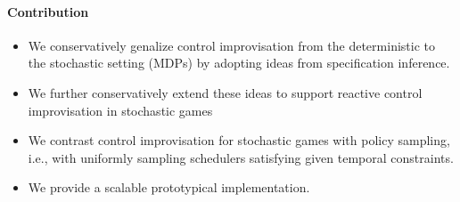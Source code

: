 \paragraph{Contribution}

\begin{itemize}
\item We conservatively genalize control improvisation from the deterministic to the stochastic setting (MDPs) by adopting ideas from specification inference.
\item We further conservatively extend these ideas to support reactive control improvisation in stochastic games
\item We contrast control improvisation for stochastic games with policy sampling, i.e., with uniformly sampling schedulers satisfying given temporal constraints.
\item We provide a scalable prototypical implementation.
\end{itemize}
